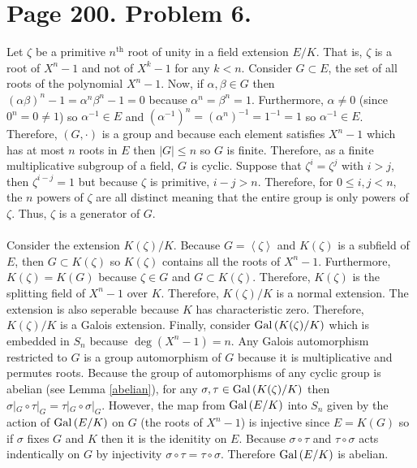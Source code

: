 \documentclass[12pt]{extarticle}
\begin{document}

\section*{Page 200. Problem 6.}
Let $\zeta$ be a primitive $n^{\mathrm{th}}$ root of unity in a field extension $E/K$. That is, $\zeta$ is a root of $X^n - 1$ and not of $X^k - 1$ for any $k < n$. Consider $G\subset E$, the set of all roots of the polynomial $X^n - 1$. Now, if $\alpha, \beta \in G$ then $(\alpha \beta)^n - 1 = \alpha^n \beta^n - 1 = 0$ because $\alpha^n = \beta^n = 1$. Furthermore, $\alpha \neq 0$ (since $0^n = 0 \neq 1$) so $\alpha^{-1} \in E$ and $(\alpha^{-1})^n = (\alpha^n)^{-1} = 1^{-1} = 1$ so $\alpha^{-1} \in E$. Therefore, $(G, \cdot)$ is a group and because each element satisfies $X^n - 1$ which has at most $n$ roots in $E$ then $|G| \le n$ so $G$ is finite. Therefore, as a finite multiplicative subgroup of a field, $G$ is cyclic. Suppose that $\zeta^i = \zeta^j$ with $i > j$, then $\zeta^{i - j} = 1$ but because $\zeta$ is primitive, $i - j > n$. Therefore, for $0 \le i, j < n$, the $n$ powers of $\zeta$ are all distinct meaning that the entire group is only powers of $\zeta$. Thus, $\zeta$ is a generator of $G$. \\\\
Consider the extension $K(\zeta)/K$. Because $G = \left< \zeta \right>$ and $K(\zeta)$ is a subfield of $E$, then $G \subset K(\zeta)$ so $K(\zeta)$ contains all the roots of $X^n - 1$. Furthermore, $K(\zeta) = K(G)$ because $\zeta \in G$ and $G \subset K(\zeta)$. Therefore, $K(\zeta)$ is the splitting field of $X^n - 1$ over $K$. Therefore, $K(\zeta)/K$ is a normal extension. The extension is also seperable because $K$ has characteristic zero. Therefore, $K(\zeta)/K$ is a Galois extension. Finally, consider $\mathrm{Gal}\left( K(\zeta)/K \right)$ which is embedded in $S_n$ because $\deg{(X^n - 1)} = n$. Any Galois automorphism restricted to $G$ is a group automorphism of $G$ because it is multiplicative and permutes roots. Because the group of automorphisms of any cyclic group is abelian (see Lemma \ref{abelian}), for any $\sigma, \tau \in \mathrm{Gal}\left( K(\zeta)/K \right)$ then $\sigma|_G \circ \tau|_G = \tau|_G \circ \sigma|_G$. However, the map from $\mathrm{Gal}\left( E/K \right)$ into $S_n$ given by the action of $\mathrm{Gal}\left( E/K \right)$ on $G$ (the roots of $X^n - 1$) is injective since $E = K(G)$ so if $\sigma$ fixes $G$ and $K$ then it is the idenitity on $E$. Because $\sigma \circ \tau$ and $\tau \circ \sigma$ acts indentically on $G$ by injectivity $\sigma \circ \tau = \tau \circ \sigma$. Therefore $\mathrm{Gal}\left( E/K \right)$ is abelian.        
\end{document}
